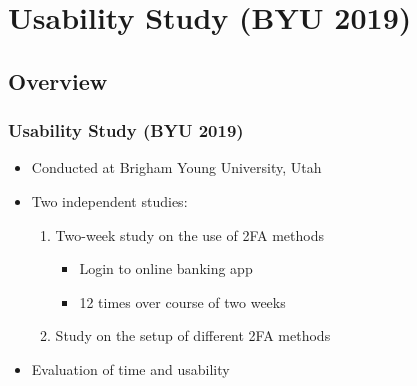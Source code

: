 \section{Usability Study (BYU 2019)}

\subsection*{Overview}
\begin{frame}
  \frametitle{Usability Study (BYU 2019)}

  \begin{itemize}
    \item Conducted at Brigham Young University, Utah
    \item Two independent studies:
          \begin{enumerate}
            \item Two-week study on the use of 2FA methods
                  \begin{itemize}
                    \item Login to online banking app
                    \item 12 times over course of two weeks
                  \end{itemize}
            \item Study on the setup of different 2FA methods
          \end{enumerate}
    \item Evaluation of time and usability
  \end{itemize}

\end{frame}

